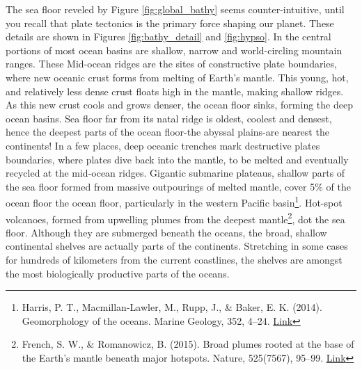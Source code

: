 \documentclass[amstex,12pt]{book}
\begin{document}
The sea floor reveled by Figure \ref{fig:global_bathy} seems counter-intuitive, until you recall that plate tectonics is the primary force shaping our planet. These details are shown in Figures \ref{fig:bathy_detail} and \ref{fig:hypso}. In the central portions of most ocean basins are shallow, narrow and world-circling mountain ranges. These Mid-ocean ridges are the sites of constructive plate boundaries, where new oceanic crust forms from melting of Earth's mantle. This young, hot, and relatively less dense crust floats high in the mantle, making shallow ridges. As this new crust cools and grows denser, the ocean floor sinks, forming the deep ocean basins. Sea floor far from its natal ridge is oldest, coolest and densest, hence the deepest parts of the ocean floor-the abyssal plains-are nearest the continents! In a few places, deep oceanic trenches mark destructive plates boundaries, where plates dive back into the mantle, to be melted and eventually recycled at the mid-ocean ridges. Gigantic submarine plateaus, shallow parts of the sea floor formed from massive outpourings of melted mantle, cover 5\% of the ocean floor the ocean floor, particularly in the western Pacific basin\footnote{Harris, P. T., Macmillan-Lawler, M., Rupp, J., \& Baker, E. K. (2014). Geomorphology of the oceans. Marine Geology, 352, 4–24. \href{https://doi.org/10.1016/j.margeo.2014.01.011}{Link}}. Hot-spot volcanoes, formed from upwelling plumes from the deepest mantle\footnote{French, S. W., \& Romanowicz, B. (2015). Broad plumes rooted at the base of the Earth’s mantle beneath major hotspots. Nature, 525(7567), 95–99. \href{https://doi.org/10.1038/nature14876}{Link}}, dot the sea floor. Although they are submerged beneath the oceans, the broad, shallow continental shelves are actually parts of the continents. Stretching in some cases for hundreds of kilometers from the current coastlines, the shelves are amongst the most biologically productive parts of the oceans.      
        
\end{document}
